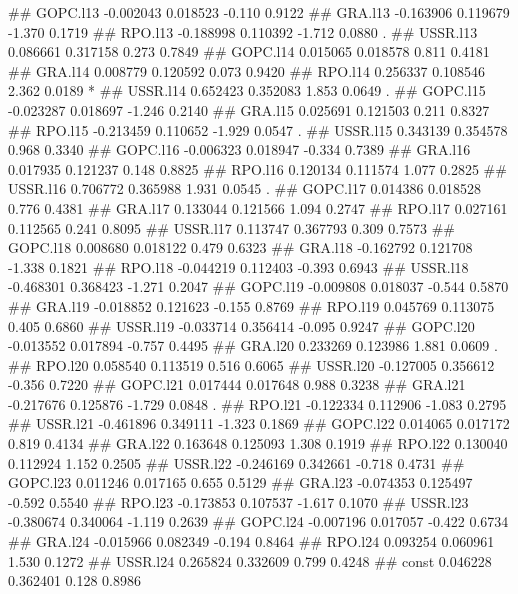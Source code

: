 \documentclass[
]{article}
\begin{document}
\begin{itemize}
## GOPC.l13 -0.002043   0.018523  -0.110   0.9122    
## GRA.l13  -0.163906   0.119679  -1.370   0.1719    
## RPO.l13  -0.188998   0.110392  -1.712   0.0880 .  
## USSR.l13  0.086661   0.317158   0.273   0.7849    
## GOPC.l14  0.015065   0.018578   0.811   0.4181    
## GRA.l14   0.008779   0.120592   0.073   0.9420    
## RPO.l14   0.256337   0.108546   2.362   0.0189 *  
## USSR.l14  0.652423   0.352083   1.853   0.0649 .  
## GOPC.l15 -0.023287   0.018697  -1.246   0.2140    
## GRA.l15   0.025691   0.121503   0.211   0.8327    
## RPO.l15  -0.213459   0.110652  -1.929   0.0547 .  
## USSR.l15  0.343139   0.354578   0.968   0.3340    
## GOPC.l16 -0.006323   0.018947  -0.334   0.7389    
## GRA.l16   0.017935   0.121237   0.148   0.8825    
## RPO.l16   0.120134   0.111574   1.077   0.2825    
## USSR.l16  0.706772   0.365988   1.931   0.0545 .  
## GOPC.l17  0.014386   0.018528   0.776   0.4381    
## GRA.l17   0.133044   0.121566   1.094   0.2747    
## RPO.l17   0.027161   0.112565   0.241   0.8095    
## USSR.l17  0.113747   0.367793   0.309   0.7573    
## GOPC.l18  0.008680   0.018122   0.479   0.6323    
## GRA.l18  -0.162792   0.121708  -1.338   0.1821    
## RPO.l18  -0.044219   0.112403  -0.393   0.6943    
## USSR.l18 -0.468301   0.368423  -1.271   0.2047    
## GOPC.l19 -0.009808   0.018037  -0.544   0.5870    
## GRA.l19  -0.018852   0.121623  -0.155   0.8769    
## RPO.l19   0.045769   0.113075   0.405   0.6860    
## USSR.l19 -0.033714   0.356414  -0.095   0.9247    
## GOPC.l20 -0.013552   0.017894  -0.757   0.4495    
## GRA.l20   0.233269   0.123986   1.881   0.0609 .  
## RPO.l20   0.058540   0.113519   0.516   0.6065    
## USSR.l20 -0.127005   0.356612  -0.356   0.7220    
## GOPC.l21  0.017444   0.017648   0.988   0.3238    
## GRA.l21  -0.217676   0.125876  -1.729   0.0848 .  
## RPO.l21  -0.122334   0.112906  -1.083   0.2795    
## USSR.l21 -0.461896   0.349111  -1.323   0.1869    
## GOPC.l22  0.014065   0.017172   0.819   0.4134    
## GRA.l22   0.163648   0.125093   1.308   0.1919    
## RPO.l22   0.130040   0.112924   1.152   0.2505    
## USSR.l22 -0.246169   0.342661  -0.718   0.4731    
## GOPC.l23  0.011246   0.017165   0.655   0.5129    
## GRA.l23  -0.074353   0.125497  -0.592   0.5540    
## RPO.l23  -0.173853   0.107537  -1.617   0.1070    
## USSR.l23 -0.380674   0.340064  -1.119   0.2639    
## GOPC.l24 -0.007196   0.017057  -0.422   0.6734    
## GRA.l24  -0.015966   0.082349  -0.194   0.8464    
## RPO.l24   0.093254   0.060961   1.530   0.1272    
## USSR.l24  0.265824   0.332609   0.799   0.4248    
## const     0.046228   0.362401   0.128   0.8986    

\end{itemize}
\end{document}
